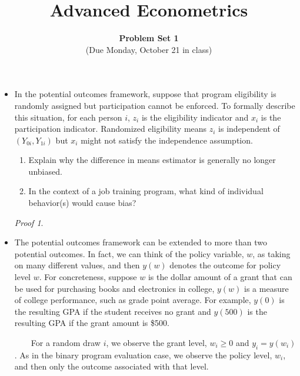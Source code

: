 \documentclass[a4paper]{ctexart}
\title{\textbf{Advanced Econometrics}}
\author{\textbf{Problem Set 1}\\(Due Monday, October 21 in class)}
\date{}
\theoremstyle{remark}
\newtheorem*{solution}{Proof}
\begin{document}
\maketitle



\begin{itemize}

\item[\textbf{1.}] In the potential outcomes framework, suppose that program eligibility is randomly assigned but participation cannot be enforced. To formally describe this situation, for each person $i$, $z_i$ is the eligibility indicator and $x_i$ is the participation indicator. Randomized eligibility means $z_i$ is independent of $(Y_{0i}, Y_{1i})$ but $x_i$ might not satisfy the independence assumption.
\begin{enumerate}
\item[i.] Explain why the difference in means estimator is generally no longer unbiased.
\item[ii.] In the context of a job training program, what kind of individual behavior(s) would cause bias?
\end{enumerate}

\begin{solution}
    
\end{solution}

\item[\textbf{2.}] The potential outcomes framework can be extended to more than two potential outcomes. In fact, we can think of the policy variable, $w$, as taking on many different values, and then $y(w)$ denotes the outcome for policy level $w$. For concreteness, suppose $w$ is the dollar amount of a grant that can be used for purchasing books and electronics in college, $y(w)$ is a measure of college performance, such as grade point average. For example, $y(0)$ is the resulting GPA if the student receives no grant and $y(500)$ is the resulting GPA if the grant amount is \$500.

~~~~For a random draw $i$, we observe the grant level, $w_i\geq 0$ and $y_i=y(w_i)$. As in the binary program evaluation case, we observe the policy level, $w_i$, and then only the outcome associated with that level.


\end{itemize}
\end{document}
